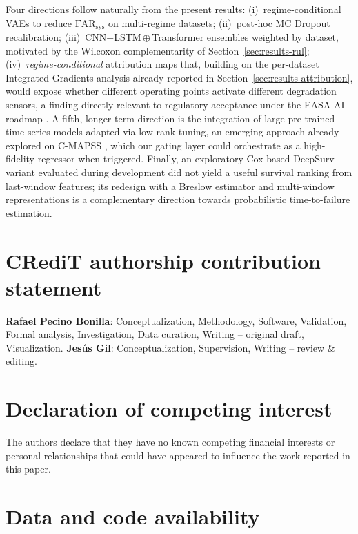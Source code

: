 \documentclass[5p,times,authoryear]{elsarticle}
\begin{document}
\begin{sloppypar}
Four directions follow naturally from the present results: (i)~regime-conditional VAEs to reduce $\mathrm{FAR}_{\mathrm{sys}}$ on multi-regime datasets; (ii)~post-hoc MC Dropout recalibration; (iii)~CNN+LSTM\,$\oplus$\,Transformer ensembles weighted by dataset, motivated by the Wilcoxon complementarity of Section~\ref{sec:results-rul}; (iv)~\emph{regime-conditional} attribution maps that, building on the per-dataset Integrated Gradients analysis already reported in Section~\ref{sec:results-attribution}, would expose whether different operating points activate different degradation sensors, a finding directly relevant to regulatory acceptance under the EASA AI roadmap \citep{easa2025roadmap}. A fifth, longer-term direction is the integration of large pre-trained time-series models adapted via low-rank tuning, an emerging approach already explored on C-MAPSS \citep{chakravarty2025llm4ts}, which our gating layer could orchestrate as a high-fidelity regressor when triggered. Finally, an exploratory Cox-based DeepSurv variant evaluated during development did not yield a useful survival ranking from last-window features; its redesign with a Breslow estimator and multi-window representations is a complementary direction towards probabilistic time-to-failure estimation.
\end{sloppypar}

\section*{CRediT authorship contribution statement}

\textbf{Rafael Pecino Bonilla}: Conceptualization, Methodology, Software, Validation, Formal analysis, Investigation, Data curation, Writing -- original draft, Visualization. \textbf{Jes\'us Gil}: Conceptualization, Supervision, Writing -- review \& editing.

\section*{Declaration of competing interest}

The authors declare that they have no known competing financial interests or personal relationships that could have appeared to influence the work reported in this paper.

\section*{Data and code availability}
\end{document}

